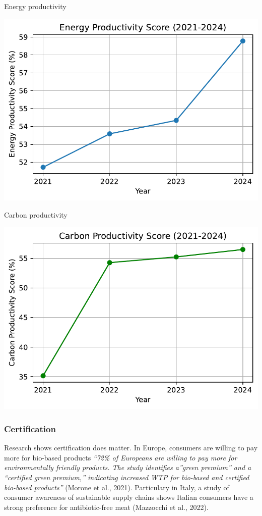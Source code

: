 \documentclass[
  letterpaper,
  DIV=11,
  numbers=noendperiod]{scrartcl}
\begin{document}
Energy productivity

\includegraphics{_thesis_files/figure-pdf/cell-47-output-1.pdf}

Carbon productivity

\includegraphics{_thesis_files/figure-pdf/cell-48-output-1.pdf}

\subsubsection{Certification}\label{certification}

Research shows certification does matter. In Europe, consumers are
willing to pay more for bio-based products \emph{``72\% of Europeans are
willing to pay more for environmentally friendly products. The study
identifies a''green premium'' and a ``certified green premium,''
indicating increased WTP for bio-based and certified bio-based
products''} (Morone et al., 2021). Particulary in Italy, a study of
consumer awareness of sustainable supply chains shows Italian consumers
have a strong preference for antibiotic-free meat (Mazzocchi et al.,
2022).
\end{document}
